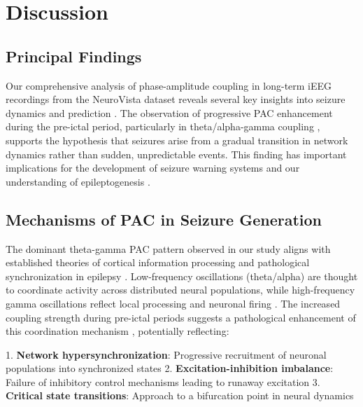 
\section{Discussion}

\subsection{Principal Findings}
Our comprehensive analysis of phase-amplitude coupling in long-term iEEG recordings from the NeuroVista dataset reveals several key insights into seizure dynamics and prediction \cite{Kuhlmann2018SeizurePA,Freestone2015SeizurePSBF}. The observation of progressive PAC enhancement during the pre-ictal period, particularly in theta/alpha-gamma coupling \cite{Ahn2022TheFIT,Radiske2020CrossFrequencyPCAR,Ponzi2023ThetagammaPAAT}, supports the hypothesis that seizures arise from a gradual transition in network dynamics rather than sudden, unpredictable events. This finding has important implications for the development of seizure warning systems and our understanding of epileptogenesis \cite{Canolty2010TheFRC,Tort2010MeasuringPCE}.

\subsection{Mechanisms of PAC in Seizure Generation}
The dominant theta-gamma PAC pattern observed in our study aligns with established theories of cortical information processing and pathological synchronization in epilepsy \cite{Canolty2010TheFRC,Aru2014UntanglingCCD}. Low-frequency oscillations (theta/alpha) are thought to coordinate activity across distributed neural populations, while high-frequency gamma oscillations reflect local processing and neuronal firing \cite{Tort2010MeasuringPCE,Hlsemann2019QuantificationOPA}. The increased coupling strength during pre-ictal periods suggests a pathological enhancement of this coordination mechanism \cite{Zhang2017TemporalspatialCOAG,Miao2021SeizureOZBG}, potentially reflecting:

1. \textbf{Network hypersynchronization}: Progressive recruitment of neuronal populations into synchronized states \cite{Ahn2022TheFIT}
2. \textbf{Excitation-inhibition imbalance}: Failure of inhibitory control mechanisms leading to runaway excitation \cite{Radiske2020CrossFrequencyPCAR}
3. \textbf{Critical state transitions}: Approach to a bifurcation point in neural dynamics \cite{Ponzi2023ThetagammaPAAT}

